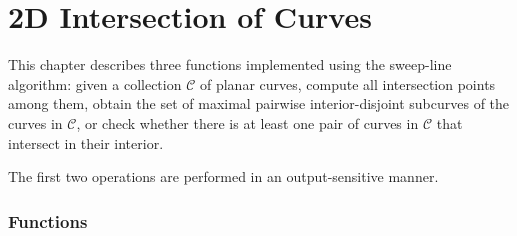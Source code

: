\chapter{2D Intersection of Curves}


This chapter describes three functions implemented using the
sweep-line algorithm: given a collection ${\mathcal C}$ of 
planar curves, compute all intersection points among them,
obtain the set of maximal pairwise interior-disjoint subcurves
of the curves in ${\mathcal C}$, or check whether there is at
least one pair of curves in ${\mathcal C}$ that intersect in
their interior.

The first two operations are performed in an output-sensitive
manner.

\subsection*{Functions}

\\
\\
